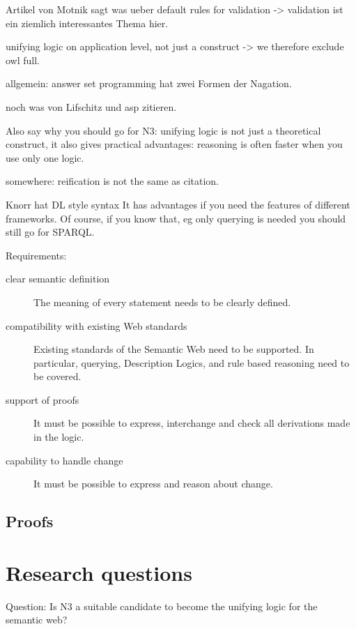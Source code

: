 Artikel von Motnik \cite{DLASP} sagt was ueber default rules for validation -> validation ist ein ziemlich interessantes Thema hier.

unifying logic on application level, not just a construct -> we therefore exclude owl full.

allgemein: answer set programming hat zwei Formen der Nagation.

noch was von Lifschitz und asp zitieren.


Also say why you should go for N3: unifying logic is not just a theoretical construct, it also gives practical advantages: reasoning is often faster when you use only one logic.  

somewhere: reification is not the same as citation.

Knorr hat DL style syntax
It has advantages if you need 
the features of different frameworks. Of course, if you know that, eg only querying is needed you should still go for SPARQL.


Requirements:
\begin{description}
 \item[clear semantic definition] 
The meaning of every statement needs to be clearly defined.
 \item[compatibility with existing Web standards]  Existing standards of the Semantic Web need to be supported. 
 In particular, querying, Description Logics, and rule based reasoning need to be covered.
 \item[support of proofs] It must be possible to express, interchange and check all derivations made in the logic.
 \item[capability to handle change] It must be possible to express and reason about change.
\end{description}

\subsection{Proofs}


\section{Research questions}
Question: Is N3 a suitable candidate to become the unifying logic for the semantic web?


